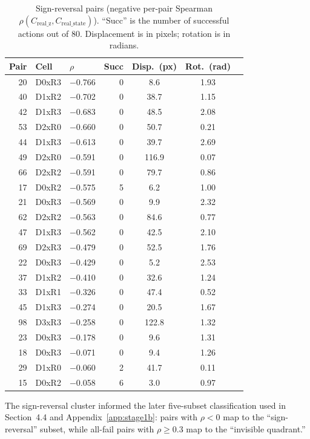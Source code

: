 \begin{table}[h]
\centering
\caption{Sign-reversal pairs (negative per-pair Spearman
$\rho(C_\text{real\_z}, C_\text{real\_state})$).  ``Succ'' is the number of
successful actions out of 80.  Displacement is in pixels; rotation is in
radians.}
\label{tab:sign-reversal}
\begin{tabular}{rllrccc}
\toprule
Pair & Cell & $\rho$ & Succ & Disp.\ (px) & Rot.\ (rad) \\
\midrule
20 & D0xR3 & $-$0.766 & 0 & 8.6 & 1.93 \\
40 & D1xR2 & $-$0.702 & 0 & 38.7 & 1.15 \\
42 & D1xR3 & $-$0.683 & 0 & 48.5 & 2.08 \\
53 & D2xR0 & $-$0.660 & 0 & 50.7 & 0.21 \\
44 & D1xR3 & $-$0.613 & 0 & 39.7 & 2.69 \\
49 & D2xR0 & $-$0.591 & 0 & 116.9 & 0.07 \\
66 & D2xR2 & $-$0.591 & 0 & 79.7 & 0.86 \\
17 & D0xR2 & $-$0.575 & 5 & 6.2 & 1.00 \\
21 & D0xR3 & $-$0.569 & 0 & 9.9 & 2.32 \\
62 & D2xR2 & $-$0.563 & 0 & 84.6 & 0.77 \\
47 & D1xR3 & $-$0.562 & 0 & 42.5 & 2.10 \\
69 & D2xR3 & $-$0.479 & 0 & 52.5 & 1.76 \\
22 & D0xR3 & $-$0.429 & 0 & 5.2 & 2.53 \\
37 & D1xR2 & $-$0.410 & 0 & 32.6 & 1.24 \\
33 & D1xR1 & $-$0.326 & 0 & 47.4 & 0.52 \\
45 & D1xR3 & $-$0.274 & 0 & 20.5 & 1.67 \\
98 & D3xR3 & $-$0.258 & 0 & 122.8 & 1.32 \\
23 & D0xR3 & $-$0.178 & 0 & 9.6 & 1.31 \\
18 & D0xR3 & $-$0.071 & 0 & 9.4 & 1.26 \\
29 & D1xR0 & $-$0.060 & 2 & 41.7 & 0.11 \\
15 & D0xR2 & $-$0.058 & 6 & 3.0 & 0.97 \\
\bottomrule
\end{tabular}
\end{table}

The sign-reversal cluster informed the later five-subset classification used
in Section~4.4 and Appendix~\ref{app:stage1b}: pairs with $\rho<0$ map to
the ``sign-reversal'' subset, while all-fail pairs with $\rho \ge 0.3$ map
to the ``invisible quadrant.''

